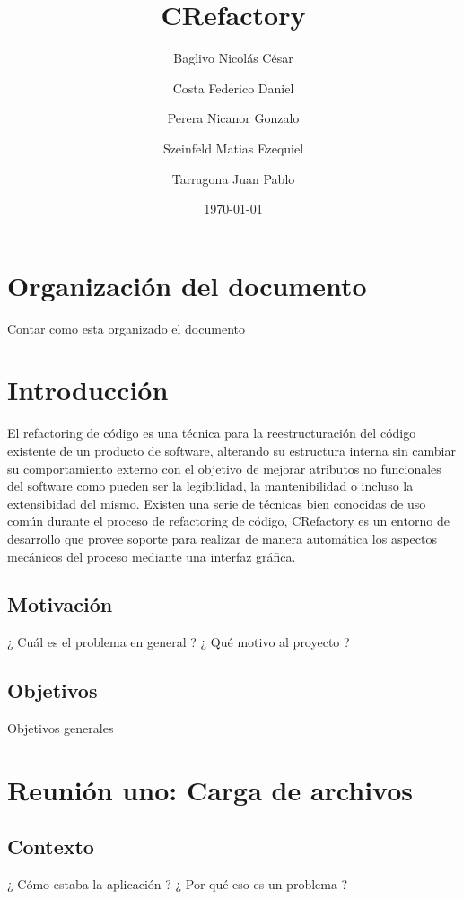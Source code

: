 \documentclass[a4paper,oneside,10pt]{article}
\begin{document}

\title{CRefactory}
\author{Baglivo Nicol\'as C\'esar \and Costa Federico Daniel \and Perera Nicanor Gonzalo \and Szeinfeld Matias Ezequiel \and Tarragona Juan Pablo}
\date{\today}
\maketitle

\tableofcontents

\section{Organizaci\'on del documento}
Contar como esta organizado el documento

\section{Introducción}
El refactoring de c\'odigo es una técnica para la reestructuración del código existente de un producto de software, alterando su estructura interna sin cambiar su comportamiento externo con el objetivo de mejorar atributos no funcionales del software como pueden ser la legibilidad, la mantenibilidad o incluso la extensibidad del mismo. Existen una serie de t\'ecnicas bien conocidas de uso com\'un durante el proceso de refactoring de c\'odigo, CRefactory es un entorno de desarrollo que provee soporte para realizar de manera autom\'atica los aspectos mec\'anicos del proceso mediante una interfaz gr\'afica.

\subsection{Motivaci\'on}
¿ Cu\'al es el problema en general ? ¿ Qu\'e motivo al proyecto ?

\subsection{Objetivos}
Objetivos generales

\section{Reuni\'on uno: Carga de archivos}

\subsection{Contexto}
¿ C\'omo estaba la aplicaci\'on ? ¿ Por qu\'e eso es un problema ?
\end{document}
